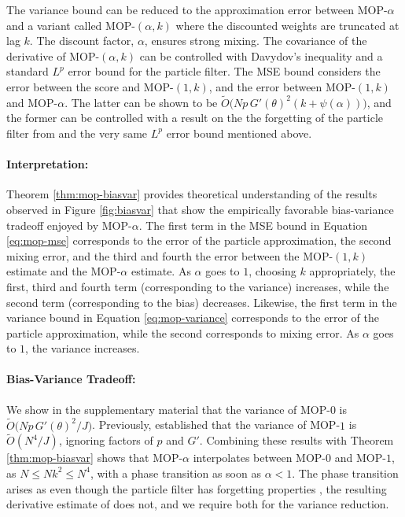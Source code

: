 \documentclass[9pt,twocolumn,pnasresearcharticle]{pnas-new}
\newcommand\arxiv[2]{#2} %
\begin{document}
The variance bound can be reduced to the approximation error between MOP-$\alpha$ and a variant called MOP-$(\alpha,k)$ where the discounted weights are truncated at lag $k$. 
The discount factor, $\alpha$, ensures strong mixing.
The covariance of the derivative of MOP-$(\alpha,k)$ can be controlled with Davydov's inequality and a standard $L^p$ error bound for the particle filter. 
The MSE bound considers the error between the score and MOP-$(1,k)$, and the error between MOP-$(1,k)$ and MOP-$\alpha$. 
The latter can be shown to be $\tilde{O}\big(Np \, G'(\theta)^2(k+\psi(\alpha))\big)$, and the former can be controlled with a result on the the forgetting of the particle filter from \cite{karjalainen23} and the very same $L^p$ error bound mentioned above. 

\paragraph{Interpretation:} Theorem \ref{thm:mop-biasvar} provides theoretical understanding of the results observed in Figure \ref{fig:biasvar} that show the empirically favorable bias-variance tradeoff enjoyed by MOP-$\alpha$.
The first term in the MSE bound in Equation \ref{eq:mop-mse} corresponds to the error of the particle approximation, the second mixing error, and the third and fourth the error between the MOP-$(1,k)$ estimate and the MOP-$\alpha$ estimate. 
As $\alpha$ goes to $1$, choosing $k$ appropriately, the first, third and fourth term (corresponding to the variance) increases, while the second term (corresponding to the bias) decreases. 
Likewise, the first term in the variance bound in Equation \ref{eq:mop-variance} corresponds to the error of the particle approximation, while the second corresponds to mixing error. 
As $\alpha$ goes to $1$, the variance increases. 

\paragraph{Bias-Variance Tradeoff:} We show in \arxiv{Appendix~\ref{appendix:biasvar}}{the supplementary material} that the variance of MOP-$0$ is $\tilde{O}\big( Np \, G'(\theta)^2\big/J \big)$.
Previously, \cite{poyiadjis11} established that the variance of MOP-$1$ is $\tilde{O}(N^4/J)$, ignoring factors of $p$ and $G'$. 
Combining these results with Theorem \ref{thm:mop-biasvar} shows that MOP-$\alpha$ interpolates between MOP-$0$ and MOP-$1$, as $N \leq Nk^2 \leq N^4$, with a phase transition as soon as $\alpha<1$. 
The phase transition arises as even though the particle filter has forgetting properties \cite{karjalainen23}, the resulting derivative estimate of \cite{poyiadjis11} does not, and we require both for the variance reduction. 
\end{document}

